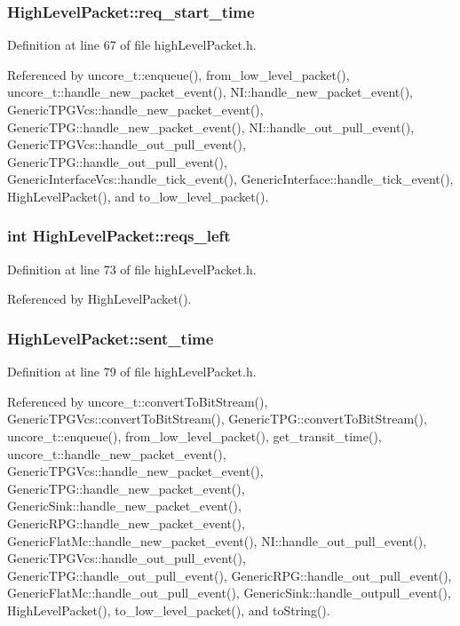 \subsubsection[{req\_\-start\_\-time}]{ {\bf HighLevelPacket::req\_\-start\_\-time}}\label{classHighLevelPacket_9976d52a0c6566b9227154d4badcfb57}




Definition at line 67 of file highLevelPacket.h.

Referenced by uncore\_\-t::enqueue(), from\_\-low\_\-level\_\-packet(), uncore\_\-t::handle\_\-new\_\-packet\_\-event(), NI::handle\_\-new\_\-packet\_\-event(), GenericTPGVcs::handle\_\-new\_\-packet\_\-event(), GenericTPG::handle\_\-new\_\-packet\_\-event(), NI::handle\_\-out\_\-pull\_\-event(), GenericTPGVcs::handle\_\-out\_\-pull\_\-event(), GenericTPG::handle\_\-out\_\-pull\_\-event(), GenericInterfaceVcs::handle\_\-tick\_\-event(), GenericInterface::handle\_\-tick\_\-event(), HighLevelPacket(), and to\_\-low\_\-level\_\-packet().
\subsubsection[{reqs\_\-left}]{\setlength{\rightskip}{0pt plus 5cm}int {\bf HighLevelPacket::reqs\_\-left}}\label{classHighLevelPacket_304a1a4171dd986e5081ba7f64cf1257}




Definition at line 73 of file highLevelPacket.h.

Referenced by HighLevelPacket().
\subsubsection[{sent\_\-time}]{ {\bf HighLevelPacket::sent\_\-time}}\label{classHighLevelPacket_eed2f14fb0b689f35a92c054a831867c}




Definition at line 79 of file highLevelPacket.h.

Referenced by uncore\_\-t::convertToBitStream(), GenericTPGVcs::convertToBitStream(), GenericTPG::convertToBitStream(), uncore\_\-t::enqueue(), from\_\-low\_\-level\_\-packet(), get\_\-transit\_\-time(), uncore\_\-t::handle\_\-new\_\-packet\_\-event(), GenericTPGVcs::handle\_\-new\_\-packet\_\-event(), GenericTPG::handle\_\-new\_\-packet\_\-event(), GenericSink::handle\_\-new\_\-packet\_\-event(), GenericRPG::handle\_\-new\_\-packet\_\-event(), GenericFlatMc::handle\_\-new\_\-packet\_\-event(), NI::handle\_\-out\_\-pull\_\-event(), GenericTPGVcs::handle\_\-out\_\-pull\_\-event(), GenericTPG::handle\_\-out\_\-pull\_\-event(), GenericRPG::handle\_\-out\_\-pull\_\-event(), GenericFlatMc::handle\_\-out\_\-pull\_\-event(), GenericSink::handle\_\-outpull\_\-event(), HighLevelPacket(), to\_\-low\_\-level\_\-packet(), and toString().
